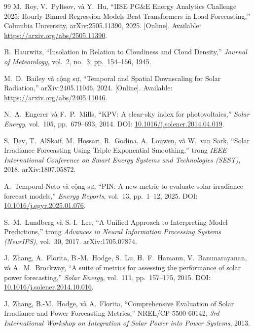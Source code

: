 \documentclass[12pt, a4paper]{report}
\begin{document}
\begin{thebibliography}{99}
M.~Roy, V.~Pyltsov, và Y.~Hu,
\newblock ``IISE PG\&E Energy Analytics Challenge 2025: Hourly-Binned Regression Models Beat Transformers in Load Forecasting,''
\newblock Columbia University, arXiv:2505.11390, 2025. [Online]. Available: \url{https://arxiv.org/abs/2505.11390}.

B.~Haurwitz,
\newblock ``Insolation in Relation to Cloudiness and Cloud Density,''
\newblock \textit{Journal of Meteorology}, vol.~2, no.~3, pp.~154--166, 1945.

M.~D.~Bailey và cộng sự,
\newblock ``Temporal and Spatial Downscaling for Solar Radiation,''
\newblock arXiv:2405.11046, 2024. [Online]. Available: \url{https://arxiv.org/abs/2405.11046}.

N.~A.~Engerer và F.~P.~Mills,
\newblock ``KPV: A clear-sky index for photovoltaics,''
\newblock \textit{Solar Energy}, vol.~105, pp.~679--693, 2014.
\newblock DOI: \href{https://doi.org/10.1016/j.solener.2014.04.019}{10.1016/j.solener.2014.04.019}.

S.~Dev, T.~AlSkaif, M.~Hossari, R.~Godina, A.~Louwen, và W.~van Sark,
\newblock ``Solar Irradiance Forecasting Using Triple Exponential Smoothing,''
\newblock trong \textit{IEEE International Conference on Smart Energy Systems and Technologies (SEST)}, 2018.
\newblock arXiv:1807.05872.

A.~Temporal-Neto và cộng sự,
\newblock ``PIN: A new metric to evaluate solar irradiance forecast models,''
\newblock \textit{Energy Reports}, vol.~13, pp.~1--12, 2025.
\newblock DOI: \href{https://doi.org/10.1016/j.egyr.2025.01.076}{10.1016/j.egyr.2025.01.076}.

S.~M.~Lundberg và S.-I.~Lee,
\newblock ``A Unified Approach to Interpreting Model Predictions,''
\newblock trong \textit{Advances in Neural Information Processing Systems (NeurIPS)}, vol.~30, 2017.
\newblock arXiv:1705.07874.

J.~Zhang, A.~Florita, B.-M.~Hodge, S.~Lu, H.~F.~Hamann, V.~Banunarayanan, và A.~M.~Brockway,
\newblock ``A suite of metrics for assessing the performance of solar power forecasting,''
\newblock \textit{Solar Energy}, vol.~111, pp.~157--175, 2015.
\newblock DOI: \href{https://doi.org/10.1016/j.solener.2014.10.016}{10.1016/j.solener.2014.10.016}.

J.~Zhang, B.-M.~Hodge, và A.~Florita,
\newblock ``Comprehensive Evaluation of Solar Irradiance and Power Forecasting Metrics,''
\newblock NREL/CP-5500-60142, \textit{3rd International Workshop on Integration of Solar Power into Power Systems}, 2013.


\end{thebibliography}
\end{document}
